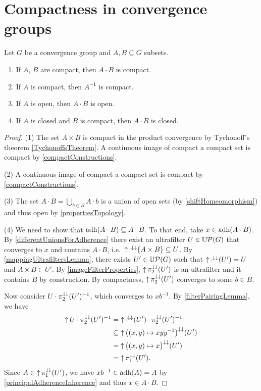\section{Compactness in convergence groups}
\begin{proposition}
Let $G$ be a convergence group and $A,B\subseteq G$ subsets.
\begin{enumerate} \label{compactSubsetsConvergenceGroups}
\item If $A$, $B$ are compact, then $A\cdot B$ is compact.
\item If $A$ is compact, then $A^{-1}$ is compact.
\item If $A$ is open, then $A\cdot B$ is open.
\item If $A$ is closed and $B$ is compact, then $A\cdot B$ is closed.
\end{enumerate}
\end{proposition}
\begin{proof}
(1) The set $A\times B$ is compact in the product convergence by Tychonoff's theorem \ref{TychonoffsTheorem}. A continuous image of compact a compact set is compact by \ref{compactConstructions}.

(2) A continuous image of compact a compact set is compact by \ref{compactConstructions}.

(3) The set $A\cdot B = \bigcup_{b\in B} A\cdot b$ is a union of open sets (by \ref{shiftHomeomorphism}) and thus open by \ref{propertiesTopology}.

(4) We need to show that $\operatorname{adh}(A\cdot B) \subseteq A\cdot B$. To that end, take $x\in \operatorname{adh}(A\cdot B)$. By \ref{differentUnionsForAdherence} there exist an ultrafilter $U\in \operatorname{\mathbb{U}\mathcal{P}}(G)$ that converges to $x$ and contains $A\cdot B$, i.e.\ $\operatorname{\uparrow}\cdot^{\downarrow\downarrow}\{A\times B\} \subseteq U$. By \ref{mappingUltrafiltersLemma}, there exists $U'\in \operatorname{\mathbb{U}\mathcal{P}}(G)$ such that $\operatorname{\uparrow}\cdot^{\downarrow\downarrow}(U') = U$ and $A\times B \in U'$. By \ref{imageFilterProperties}, $\operatorname{\uparrow} \pi_2^{\downarrow\downarrow}(U')$ is an ultrafilter and it contains $B$ by construction.
By compactness, $\operatorname{\uparrow} \pi_2^{\downarrow\downarrow}(U')$ converges to some $b\in B$.

Now consider $U\cdot \pi_2^{\downarrow\downarrow}(U')^{-1}$, which converges to $xb^{-1}$. By \ref{filterPairingLemma}, we have
\begin{align*}
\operatorname{\uparrow} U\cdot \pi_2^{\downarrow\downarrow}(U')^{-1} &= \operatorname{\uparrow}\cdot^{\downarrow\downarrow}(U')\cdot \pi_2^{\downarrow\downarrow}(U')^{-1} \\
&\subseteq \operatorname{\uparrow} \big((x,y)\mapsto xyy^{-1}\big)^{\downarrow\downarrow}(U') \\
&= \operatorname{\uparrow} \big((x,y)\mapsto x\big)^{\downarrow\downarrow}(U') \\
&= \operatorname{\uparrow} \pi_1^{\downarrow\downarrow}(U').
\end{align*}
Since $A\in \operatorname{\uparrow} \pi_1^{\downarrow\downarrow}(U')$, we have $xb^{-1}\in \operatorname{adh}(A) = A$ by \ref{principalAdherenceInherence} and thus $x\in A\cdot B$.
\end{proof}


